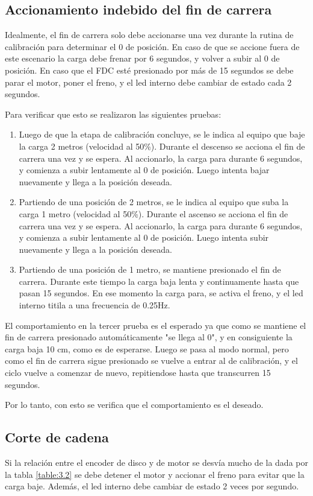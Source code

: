 \subsection{Accionamiento indebido del fin de carrera}
Idealmente, el fin de carrera solo debe accionarse una vez durante la rutina de calibración para determinar el 0 de posición. En caso de que se accione fuera de este escenario la carga debe frenar por 6 segundos, y volver a subir al 0 de posición. En caso que el FDC esté presionado por más de 15 segundos se debe parar el motor, poner el freno, y el led interno debe cambiar de estado cada 2 segundos.

Para verificar que esto se realizaron las siguientes pruebas:
\begin{enumerate}
	\item Luego de que la etapa de calibración concluye, se le indica al equipo que baje la carga 2 metros (velocidad al 50\%). Durante el descenso se acciona el fin de carrera una vez y se espera. Al accionarlo, la carga para durante 6 segundos, y comienza a subir lentamente al 0 de posición. Luego intenta bajar nuevamente y llega a la posición deseada.
	\item Partiendo de una posición de 2 metros, se le indica al equipo que suba la carga 1 metro (velocidad al 50\%). Durante el ascenso se acciona el fin de carrera una vez y se espera. Al accionarlo, la carga para durante 6 segundos, y comienza a subir lentamente al 0 de posición. Luego intenta subir nuevamente y llega a la posición deseada.
	\item Partiendo de una posición de 1 metro, se mantiene presionado el fin de carrera. Durante este tiempo la carga baja lenta y continuamente hasta que pasan 15 segundos. En ese momento la carga para, se activa el freno, y el led interno titila a una frecuencia de 0.25Hz.
\end{enumerate}

El comportamiento en la tercer prueba es el esperado ya que como se mantiene el fin de carrera presionado automáticamente "se llega al 0", y en consiguiente la carga baja 10 cm, como es de esperarse. Luego se pasa al modo normal, pero como el fin de carrera sigue presionado se vuelve a entrar al de calibración, y el ciclo vuelve a comenzar de nuevo, repitiendose hasta que transcurren 15 segundos.

Por lo tanto, con esto se verifica que el comportamiento es el deseado.
	
\newpage
\subsection{Corte de cadena}
Si la relación entre el encoder de disco y de motor se desvía mucho de la dada por la tabla \ref{table:3.2} se debe detener el motor y accionar el freno para evitar que la carga baje. Además, el led interno debe cambiar de estado 2 veces por segundo.

